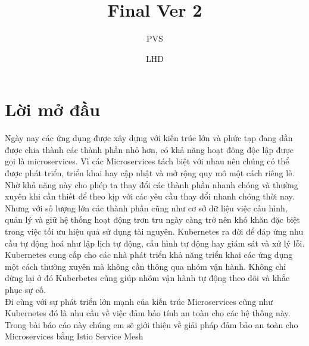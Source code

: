 \documentclass[14pt,a4paper]{book}
\author{PVS}
\author{LHD}
\title{Final Ver 2}
\begin{document}
\setcounter{page}{1}

\tableofcontents

\listoffigures
{}

\chapter*{\centering Lời mở đầu}
\hspace{0.6cm}{Nhiều năm trước, hầu hết các ứng dụng phần mềm đều được xây dựng với kiến trúc monolith hay còn gọi là kiến trúc 1 khối là mẫu thiết kế được dùng nhiều nhất trong giới lập trình web hiện nay bởi tính đơn giản của nó khi phát triển và khi triển khai. Các ứng dụng này chạy dưới dạng một tiến trình đơn lẻ hoặc số lượng nhỏ các tiến trình trên một số ít máy chủ. Chúng có khả năng cập nhật và nâng cấp chậm và yêu cầu nâng cấp thường xuyên. Trong trường hợp có sự cố như lỗi phần cứng hệ thống phần mềm này sẽ phải được di chuyển một cách thủ công sang các máy chủ còn hoạt động tốt.\\}

Ngày nay các ứng dụng được xây dựng với kiến trúc lớn và phức tạp đang dần được chia thành các thành phần nhỏ hơn, có khả năng hoạt đông độc lập được gọi là microservices. Vì các Microservices tách biệt với nhau nên chúng có thể được phát triển, triển khai hay cập nhật và mở rộng quy mô một cách riêng lẻ. Nhờ khả năng này cho phép ta thay đổi các thành phần nhanh chóng và thường xuyên khi cần thiết để theo kịp với các yêu cầu thay đổi nhanh chóng thời nay.\\

Nhưng với số lượng lớn các thành phần cũng như cơ sở dữ liệu việc cấu hình, quản lý và giữ hệ thống hoạt động trơn tru ngày càng trở nên khó khăn đặc biệt trong việc tối ưu hiệu quả sử dụng tài nguyên. Kubernetes ra đời để đáp ứng nhu cầu tự động hoá như lập lịch tự động, cấu hình tự động hay giám sát và xử lý lỗi.\\

Kubernetes cung cấp cho các nhà phát triển khả năng triển khai các ứng dụng một cách thường xuyên mà không cần thông qua nhóm vận hành. Không chỉ dừng lại ở đó Kuberbetes cũng giúp nhóm vận hành tự động theo dõi và khắc phục sự cố. \\

Đi cùng với sự phát triển lớn mạnh của kiến trúc Microservices cũng như Kubernetes đó là nhu cầu về việc đảm bảo tính an toàn cho các hệ thống này. Trong bài báo cáo này chúng em sẽ giới thiệu về giải pháp đảm bảo an toàn cho Microservices bằng Istio Service Mesh
	
\end{document}
